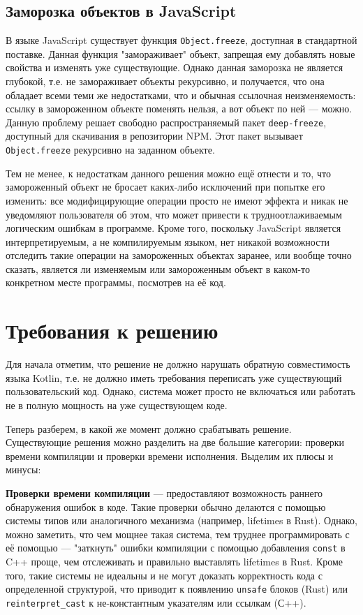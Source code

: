 \documentclass[specification,annotation,times]{itmo-student-thesis}
\begin{document}
\subsection{Заморозка объектов в JavaScript}\label{js_freeze}

В языке JavaScript существует функция \texttt{Object.freeze}, доступная в стандартной поставке. Данная функция "замораживает" объект, запрещая ему добавлять новые свойства и изменять уже существующие.
Однако данная заморозка не является глубокой, т.е. не замораживает объекты рекурсивно, и получается, что она обладает всеми теми же недостатками, что и обычная ссылочная неизменяемость: ссылку в замороженном объекте поменять нельзя, а вот объект по ней --- можно.
Данную проблему решает свободно распространяемый пакет \texttt{deep-freeze}, доступный для скачивания в репозитории NPM. Этот пакет вызывает \texttt{Object.freeze} рекурсивно на заданном объекте.

Тем не менее, к недостаткам данного решения можно ещё отнести и то, что замороженный объект не бросает каких-либо исключений при попытке его изменить: все модифицирующие операции просто не имеют эффекта и никак не уведомляют пользователя об этом, что может привести к трудноотлаживаемым логическим ошибкам в программе. Кроме того, поскольку JavaScript является интерпретируемым, а не компилируемым языком, нет никакой возможности отследить такие операции на замороженных объектах заранее, или вообще точно сказать, является ли изменяемым или замороженным объект в каком-то конкретном месте программы, посмотрев на её код.

\section{Требования к решению}

Для начала отметим, что решение не должно нарушать обратную совместимость языка Kotlin, т.е. не должно иметь требования переписать уже существующий пользовательский код. Однако, система может просто не включаться или работать не в полную мощность на уже существующем коде.

Теперь разберем, в какой же момент должно срабатывать решение. Существующие решения можно разделить на две большие категории: проверки времени компиляции и проверки времени исполнения.
Выделим их плюсы и минусы:

\textbf{Проверки времени компиляции} --- предоставляют возможность раннего обнаружения ошибок в коде. Такие проверки обычно делаются с помощью системы типов или аналогичного механизма (например, lifetimes в Rust).
Однако, можно заметить, что чем мощнее такая система, тем труднее программировать с её помощью --- "заткнуть" ошибки компиляции с помощью добавления \texttt{const} в C++ проще, чем отслеживать и правильно выставлять lifetimes в Rust.
Кроме того, такие системы не идеальны и не могут доказать корректность кода с определенной структурой, что приводит к появлению \texttt{unsafe} блоков (Rust) или \texttt{reinterpret\_cast} к не-константным указателям или ссылкам (С++).
\end{document}
